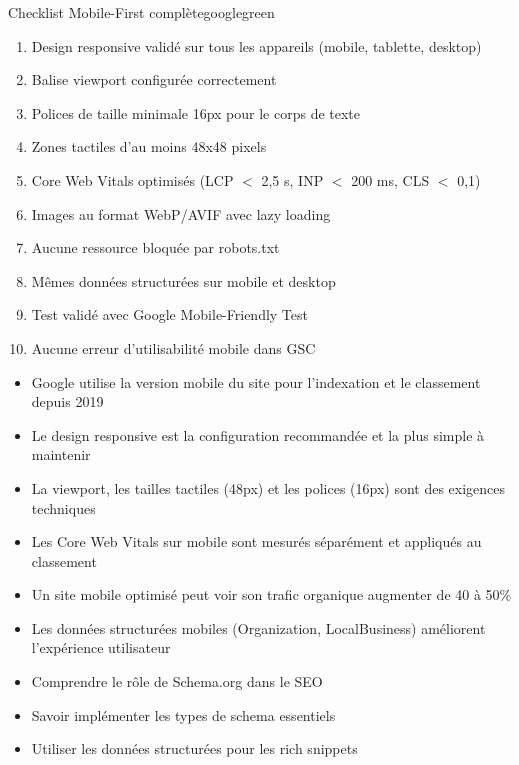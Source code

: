\documentclass[12pt,a4paper,twoside]{report}
\newcommand{\level}[1]{\medskip\bigskip}
\begin{document}
\begin{mybox}{Checklist Mobile-First complète}{googlegreen}
\begin{enumerate}
    \item Design responsive validé sur tous les appareils (mobile, tablette, desktop)
    \item Balise viewport configurée correctement
    \item Polices de taille minimale 16px pour le corps de texte
    \item Zones tactiles d'au moins 48x48 pixels
    \item Core Web Vitals optimisés (LCP $<$ 2,5 s, INP $<$ 200 ms, CLS $<$ 0,1)
    \item Images au format WebP/AVIF avec lazy loading
    \item Aucune ressource bloquée par robots.txt
    \item Mêmes données structurées sur mobile et desktop
    \item Test validé avec Google Mobile-Friendly Test
    \item Aucune erreur d'utilisabilité mobile dans GSC
\end{enumerate}
\end{mybox}

\begin{takeaways}
\begin{itemize}
    \item Google utilise la version mobile du site pour l'indexation et le classement depuis 2019
    \item Le design responsive est la configuration recommandée et la plus simple à maintenir
    \item La viewport, les tailles tactiles (48px) et les polices (16px) sont des exigences techniques
    \item Les Core Web Vitals sur mobile sont mesurés séparément et appliqués au classement
    \item Un site mobile optimisé peut voir son trafic organique augmenter de 40 à 50\%
    \item Les données structurées mobiles (Organization, LocalBusiness) améliorent l'expérience utilisateur
\end{itemize}
\end{takeaways}

\level{2}
\begin{objectives}
\begin{itemize}
    \item Comprendre le rôle de Schema.org dans le SEO
    \item Savoir implémenter les types de schema essentiels
    \item Utiliser les données structurées pour les rich snippets
\end{itemize}
\end{objectives}
\end{document}
